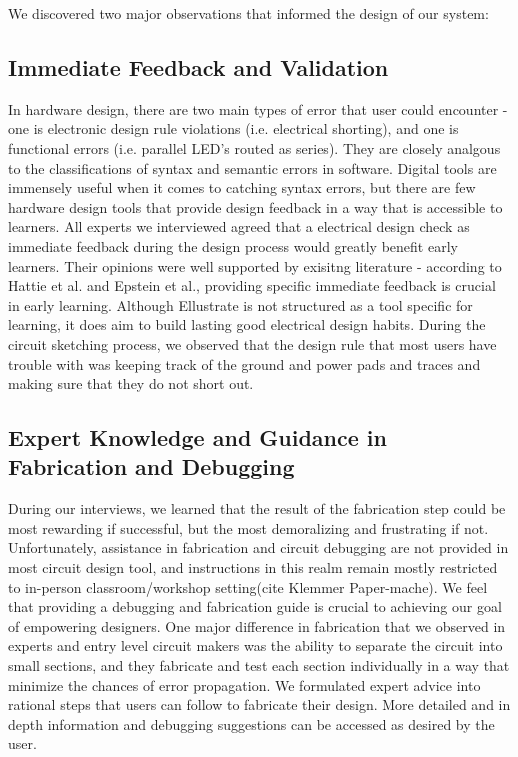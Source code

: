\documentclass{sigchi}
\begin{document}
We discovered two major observations that informed the design of our system:

\subsection{Immediate Feedback and Validation}
In hardware design, there are two main types of error that user could encounter - one is electronic design rule violations (i.e. electrical shorting), and one is functional errors (i.e. parallel LED's routed as series). They are closely analgous to the classifications of syntax and semantic errors in software. Digital tools are immensely useful when it comes to catching syntax errors, but there are few hardware design tools that provide design feedback in a way that is accessible to learners. All experts we interviewed agreed that a electrical design check as immediate feedback during the design process would greatly benefit early learners. Their opinions were well supported by exisitng literature - according to Hattie et al. and Epstein et al., providing specific immediate feedback is crucial in early learning. Although Ellustrate is not structured as a tool specific for learning, it does aim to build lasting good electrical design habits. During the circuit sketching process, we observed that the design rule that most users have trouble with was keeping track of the ground and power pads and traces and making sure that they do not short out. 

\subsection{Expert Knowledge and Guidance in Fabrication and Debugging}

During our interviews, we learned that the result of the fabrication step could be most rewarding if successful, but the most demoralizing and frustrating if not. Unfortunately, assistance in fabrication and circuit debugging are not provided in most circuit design tool, and instructions in this realm remain mostly restricted to in-person classroom/workshop setting(cite Klemmer Paper-mache). We feel that providing a debugging and fabrication guide is crucial to achieving our goal of empowering designers. One major difference in fabrication that we observed in experts and entry level circuit makers was the ability to separate the circuit into small sections, and they fabricate and test each section individually in a way that minimize the chances of error propagation. We formulated expert advice into rational steps that users can follow to fabricate their design. More detailed and in depth information and debugging suggestions can be accessed as desired by the user.  
\end{document}
